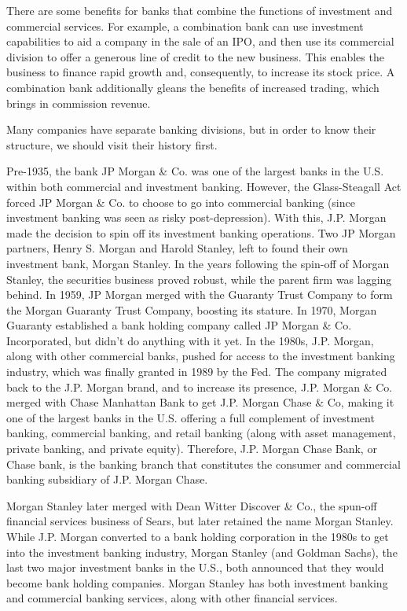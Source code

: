 \documentclass{article}
\begin{document}
      There are some benefits for banks that combine the functions of investment and commercial services. For example, a combination bank can use investment capabilities to aid a company in the sale of an IPO, and then use its commercial division to offer a generous line of credit to the new business. This enables the business to finance rapid growth and, consequently, to increase its stock price. A combination bank additionally gleans the benefits of increased trading, which brings in commission revenue.

      Many companies have separate banking divisions, but in order to know their structure, we should visit their history first. 

      \begin{example}
        Pre-1935, the bank JP Morgan \& Co. was one of the largest banks in the U.S. within both commercial and investment banking. However, the Glass-Steagall Act forced JP Morgan \& Co. to choose to go into commercial banking (since investment banking was seen as risky post-depression). With this, J.P. Morgan made the decision to spin off its investment banking operations. Two JP Morgan partners, Henry S. Morgan and Harold Stanley, left to found their own investment bank, Morgan Stanley. In the years following the spin-off of Morgan Stanley, the securities business proved robust, while the parent firm was lagging behind. In 1959, JP Morgan merged with the Guaranty Trust Company to form the Morgan Guaranty Trust Company, boosting its stature. In 1970, Morgan Guaranty established a bank holding company called JP Morgan \& Co. Incorporated, but didn't do anything with it yet. In the 1980s, J.P. Morgan, along with other commercial banks, pushed for access to the investment banking industry, which was finally granted in 1989 by the Fed. The company migrated back to the J.P. Morgan brand, and to increase its presence, J.P. Morgan \& Co. merged with Chase Manhattan Bank to get J.P. Morgan Chase \& Co, making it one of the largest banks in the U.S. offering a full complement of investment banking, commercial banking, and retail banking (along with asset management, private banking, and private equity). Therefore, J.P. Morgan Chase Bank, or Chase bank, is the banking branch that constitutes the consumer and commercial banking subsidiary of J.P. Morgan Chase. 

        Morgan Stanley later merged with Dean Witter Discover \& Co., the spun-off financial services business of Sears, but later retained the name Morgan Stanley. While J.P. Morgan converted to a bank holding corporation in the 1980s to get into the investment banking industry, Morgan Stanley (and Goldman Sachs), the last two major investment banks in the U.S., both announced that they would become bank holding companies. Morgan Stanley has both investment banking and commercial banking services, along with other financial services. 
      \end{example}
\end{document}
